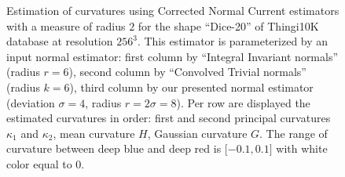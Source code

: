 \begin{figure}
    \begin{center}
    \end{center}
    \caption{\label{fig:fig-curvatures}Estimation of curvatures using
    Corrected Normal Current estimators \cite{lachaud:2022-dcg}
    with a measure of radius $2$ for the shape ``Dice-20'' of
    Thingi10K database at resolution $256^3$. This estimator is
    parameterized by an input normal estimator: first column by
    ``Integral Invariant normals'' (radius $r=6$), second column
    by ``Convolved Trivial normals'' (radius $k=6$), third
    column by our presented normal estimator (deviation
        $\sigma=4$, radius $r=2\sigma=8$). Per row are displayed the
        estimated curvatures in order: first and second principal
        curvatures $\kappa_1$ and $\kappa_2$, mean curvature $H$,
        Gaussian curvature $G$. The range of curvature between deep
        blue and deep red is $\lbrack -0.1, 0.1 \rbrack$ with white
        color equal to $0$.}
\end{figure}